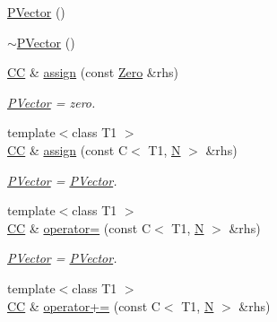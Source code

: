 \begin{DoxyCompactItemize}
\item 
\mbox{\hyperlink{classENSEM_1_1PVector_afc5f971e6ec88789c8205b2e03b1edfd}{P\+Vector}} ()
\item 
\mbox{\hyperlink{classENSEM_1_1PVector_a74ba2f55760e8ed1947ef3bb534400b6}{$\sim$\+P\+Vector}} ()
\item 
\mbox{\hyperlink{classENSEM_1_1PVector_a92dc0a0a301a3dc96f7be5d337019bc7}{CC}} \& \mbox{\hyperlink{classENSEM_1_1PVector_a2dec9eb5015ac1a8a261a20c08d9650c}{assign}} (const \mbox{\hyperlink{structENSEM_1_1Zero}{Zero}} \&rhs)
\begin{DoxyCompactList}\small\item\em \mbox{\hyperlink{classENSEM_1_1PVector}{P\+Vector}} = zero. \end{DoxyCompactList}\item 
{\footnotesize template$<$class T1 $>$ }\\\mbox{\hyperlink{classENSEM_1_1PVector_a92dc0a0a301a3dc96f7be5d337019bc7}{CC}} \& \mbox{\hyperlink{classENSEM_1_1PVector_ab908e56421fdbff29813fb8bdaecdb6f}{assign}} (const C$<$ T1, \mbox{\hyperlink{adat__devel_2lib_2hadron_2operator__name__util_8cc_a7722c8ecbb62d99aee7ce68b1752f337}{N}} $>$ \&rhs)
\begin{DoxyCompactList}\small\item\em \mbox{\hyperlink{classENSEM_1_1PVector}{P\+Vector}} = \mbox{\hyperlink{classENSEM_1_1PVector}{P\+Vector}}. \end{DoxyCompactList}\item 
{\footnotesize template$<$class T1 $>$ }\\\mbox{\hyperlink{classENSEM_1_1PVector_a92dc0a0a301a3dc96f7be5d337019bc7}{CC}} \& \mbox{\hyperlink{classENSEM_1_1PVector_a2917b5cc8ed23d68b4cc6f1cfb0f9172}{operator=}} (const C$<$ T1, \mbox{\hyperlink{adat__devel_2lib_2hadron_2operator__name__util_8cc_a7722c8ecbb62d99aee7ce68b1752f337}{N}} $>$ \&rhs)
\begin{DoxyCompactList}\small\item\em \mbox{\hyperlink{classENSEM_1_1PVector}{P\+Vector}} = \mbox{\hyperlink{classENSEM_1_1PVector}{P\+Vector}}. \end{DoxyCompactList}\item 
{\footnotesize template$<$class T1 $>$ }\\\mbox{\hyperlink{classENSEM_1_1PVector_a92dc0a0a301a3dc96f7be5d337019bc7}{CC}} \& \mbox{\hyperlink{classENSEM_1_1PVector_a39e015a8751290105c2960d1607c1ce8}{operator+=}} (const C$<$ T1, \mbox{\hyperlink{adat__devel_2lib_2hadron_2operator__name__util_8cc_a7722c8ecbb62d99aee7ce68b1752f337}{N}} $>$ \&rhs)

\end{DoxyCompactItemize}
